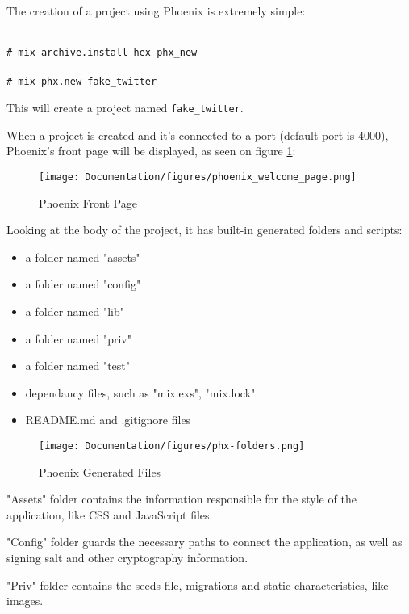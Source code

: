 The creation of a project using Phoenix is extremely simple: \newline

{
\newcommand{\shellcmd}[1]{\\\indent\indent\texttt{\footnotesize\# #1}\\}
    \shellcmd{mix archive.install hex phx\_new}
    \shellcmd{mix phx.new fake\_twitter}
}

This will create a project named \texttt{fake\_twitter}. \newline

When a project is created and it's connected to a port (default port is 4000), Phoenix's front page will be displayed, as seen on figure \ref{fig:phoenix}:

\begin{figure}[htbp]
	\centering
	\texttt{[image: Documentation/figures/phoenix\_welcome\_page.png]}  %
	\caption{Phoenix Front Page}
	\label{fig:phoenix}
\end{figure}

Looking at the body of the project, it has built-in generated folders and scripts:

\begin{itemize}
    \item a folder named "assets"
    \item a folder named "config"
    \item a folder named "lib"
    \item a folder named "priv"
    \item a folder named "test"
    \item dependancy files, such as "mix.exs", "mix.lock"
    \item README.md and .gitignore files
\end{itemize}

\begin{figure}[htbp]
	\centering
	\texttt{[image: Documentation/figures/phx-folders.png]}  %
	\caption{Phoenix Generated Files}
	\label{fig:phx}
\end{figure}

"Assets" folder contains the information responsible for the style of the application, like CSS and JavaScript files.

"Config" folder guards the necessary paths to connect the application, as well as signing salt and other cryptography information.

"Priv" folder contains the seeds file, migrations and static characteristics, like images.

